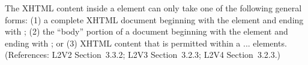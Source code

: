 The XHTML content inside a  element can only take one of the
following general forms: (1) a complete XHTML document beginning with the
element  and ending with ; (2) the ``body''
portion of a document beginning with the element  and ending
with ; or (3) XHTML content that is permitted within a
 ...  elements.  (References: L2V2
Section~3.3.2; L2V3 Section~3.2.3; L2V4 Section~3.2.3.)
